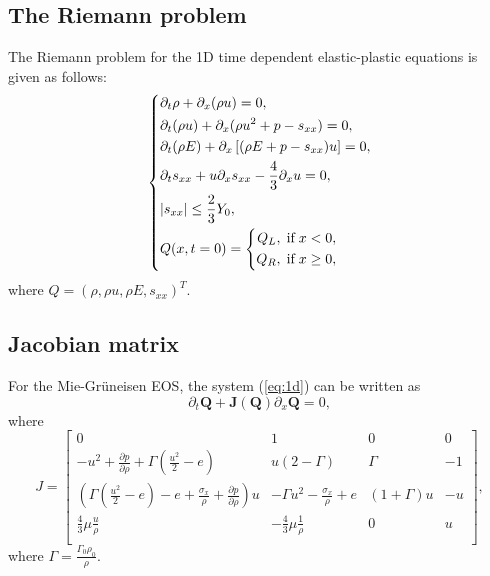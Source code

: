 \documentclass{article}
\numberwithin{equation}{section}
\numberwithin{table}{section}
\begin{document}
\subsection{The Riemann problem}

The Riemann problem for the 1D time dependent elastic-plastic equations is given as follows:
 \begin{equation}\label{eq:1d}
   \left\{ \begin{aligned}
	   & \partial _t \rho +\partial_x(\rho u)=0,\\
	   & \partial _t (\rho u)+\partial_x(\rho u^2 + p -s_{xx})=0,\\
	   &\partial _t (\rho E)+\partial_x\left[(\rho E + p -s_{xx})u\right]=0,\\
	   &\partial _t s_{xx}+u\partial_xs_{xx}-\frac{4}{3}\partial_x u=0,\\
& |s_{xx}|\leq \frac{2}{3}Y_{0}, \\
	   &Q(x,t = 0) = \left\{\begin{aligned}
		   Q_L, \hspace{0.1cm} \text{if} \hspace{0.1cm} x<0, \\
		   Q_R, \hspace{0.1cm} \text{if} \hspace{0.1cm} x\ge 0, \\
	   \end{aligned}\right.
	 \end{aligned}
  \right.
\end{equation}
where $Q = (\rho, \rho u, \rho E, s_{xx})^T$.

\subsection{Jacobian matrix} %
For the Mie-Gr\"uneisen EOS, the system (\ref{eq:1d}) can be written as
\begin{equation}
  \partial _t \bm{Q} +\bm{J}(\bm{Q})\partial_x\bm{Q} = 0,
\end{equation}
where
\begin{equation}\label{eq:Jcb}
  J = \left[\begin{array}{llll}
	  0 & 1 & 0 & 0 \\
	  -u^2 + \frac{\partial p}{\partial \rho} +\Gamma(\frac{u^2}{2}-e)& u(2-\Gamma)& \Gamma & -1 \\
	  (\Gamma(\frac{u^2}{2}-e)-e+\frac{\sigma_x}{\rho}+\frac{\partial p}{\partial \rho})u & -\Gamma u^2 -\frac{\sigma_x}{\rho} +e & (1+\Gamma)u& -u\\
	\frac{4}{3}\mu\frac{u}{\rho} & -\frac{4}{3}\mu\frac{1}{\rho}& 0 & u \\
\end{array}
\right],
\end{equation}
where $\Gamma = \frac{\Gamma_0\rho_0}{\rho} $.
\end{document}

